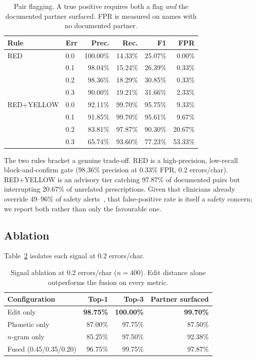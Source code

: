 \documentclass[conference]{IEEEtran}
\begin{document}
\begin{table}[t]
\caption{Pair flagging. A true positive requires both a flag \emph{and} the
documented partner surfaced. FPR is measured on names with no documented partner.}
\label{tab:flagging}
\centering
\footnotesize
\begin{tabular}{@{}llrrrr@{}}
\toprule
Rule & Err & Prec. & Rec. & F1 & FPR \\
\midrule
RED
 & 0.0 & 100.00\% & 14.33\% & 25.07\% & 0.00\% \\
 & 0.1 & 98.04\%  & 15.24\% & 26.39\% & 0.33\% \\
 & 0.2 & 98.36\%  & 18.29\% & 30.85\% & 0.33\% \\
 & 0.3 & 90.00\%  & 19.21\% & 31.66\% & 2.33\% \\
\midrule
RED+YELLOW
 & 0.0 & 92.11\% & 99.70\% & 95.75\% & 9.33\%  \\
 & 0.1 & 91.85\% & 99.70\% & 95.61\% & 9.67\%  \\
 & 0.2 & 83.81\% & 97.87\% & 90.30\% & 20.67\% \\
 & 0.3 & 65.74\% & 93.60\% & 77.23\% & 53.33\% \\
\bottomrule
\end{tabular}
\end{table}

The two rules bracket a genuine trade-off. RED is a high-precision,
low-recall block-and-confirm gate (98.36\% precision at 0.33\% FPR, 0.2
errors/char). RED+YELLOW is an advisory tier catching 97.87\%
of documented pairs but interrupting 20.67\% of unrelated prescriptions. Given
that clinicians already override 49--96\% of safety
alerts~\cite{vandersijs2006override}, that false-positive rate is itself a
safety concern; we report both rather than only the favourable one.

\subsection{Ablation}
Table~\ref{tab:ablation} isolates each signal at 0.2 errors/char.

\begin{table}[t]
\caption{Signal ablation at 0.2 errors/char ($n=400$). Edit distance alone
outperforms the fusion on every metric.}
\label{tab:ablation}
\centering
\begin{tabular}{@{}lrrr@{}}
\toprule
Configuration & Top-1 & Top-3 & Partner surfaced \\
\midrule
Edit only                   & \textbf{98.75\%} & \textbf{100.00\%} & \textbf{99.70\%} \\
Phonetic only               & 87.00\% & 97.75\%  & 87.50\% \\
$n$-gram only               & 85.25\% & 97.50\%  & 92.38\% \\
Fused (0.45/0.35/0.20)      & 96.75\% & 99.75\%  & 97.87\% \\
\bottomrule
\end{tabular}
\end{table}
\end{document}

